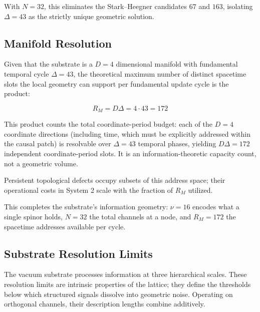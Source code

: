 With $N=32$, this eliminates the Stark--Heegner candidates $67$ and $163$, isolating $\Delta = 43$ as the strictly unique geometric solution.


\subsection{Manifold Resolution}
\label{subsec:manifold_resolution}

Given that the substrate is a $D=4$ dimensional manifold with fundamental temporal cycle $\Delta=43$, the theoretical maximum number of distinct spacetime slots the local geometry can support per fundamental update cycle is the product:

\begin{equation}
    R_M = D\Delta = 4 \cdot 43 = 172
\end{equation}

This product counts the total coordinate-period budget: each of the $D=4$ coordinate directions (including time, which must be explicitly addressed within the causal patch) is resolvable over $\Delta=43$ temporal phases, yielding $D\Delta=172$ independent coordinate-period slots. It is an information-theoretic capacity count, not a geometric volume.

Persistent topological defects occupy subsets of this address space; their operational costs in System 2 scale with the fraction of $R_M$ utilized.

This completes the substrate's information geometry: $\nu=16$ encodes what a single spinor holds, $N=32$ the total channels at a node, and $R_M=172$ the spacetime addresses available per cycle.


\subsection{Substrate Resolution Limits}
\label{sec:resolution_limits}

The vacuum substrate processes information at three hierarchical scales. These resolution limits are intrinsic properties of the lattice; they define the thresholds below which structured signals dissolve into geometric noise. Operating on orthogonal channels, their description lengths combine additively.

